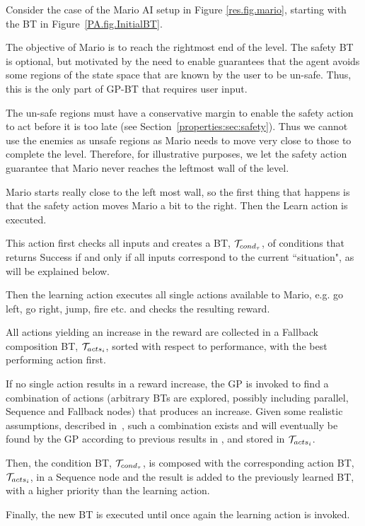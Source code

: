 \begin{example}
Consider the case of the Mario AI setup in Figure \ref{res.fig.mario},  starting with the BT in Figure~\ref{PA.fig.InitialBT}.

The objective of Mario is to reach the rightmost end of the level.
The safety BT is optional, but motivated by the need 
to enable guarantees that the agent avoids some regions of the state space that are known by the user to be un-safe.
Thus, this is the only part of GP-BT that requires user input.

The un-safe regions must have a conservative margin to enable the safety action to act before it is too late (see Section~\ref{properties:sec:safety}).
Thus we cannot use the enemies as unsafe regions as
Mario needs to move very close to those to complete the level.
Therefore, for illustrative purposes, we let the safety action guarantee that Mario never reaches the leftmost wall of the level.

Mario starts really close to the left most wall, so the first thing that happens is that the safety action moves Mario a bit to the right. Then the Learn action is executed.

This action first checks all inputs and creates a BT, $\mathcal{T}_{cond_\tau}$, of conditions that returns Success if and only if all inputs correspond to the current ``situation", as will be explained below.

Then the learning action executes all single actions available to Mario, e.g. go left, go right, jump, fire etc. and checks the resulting  reward.

All actions yielding an increase in the reward are collected in a Fallback composition BT, $\mathcal{T}_{acts_i}$, sorted with respect to performance,  with the best performing action first.

If no single action results in a reward increase, the GP is invoked to find a combination of actions (arbitrary BTs are explored, possibly including parallel, Sequence and Fallback nodes) that produces an increase. Given some realistic assumptions, described in~\cite{colledanchise2015learning}, such a combination exists and will eventually be found by the GP according to previous results in \cite{rudolph1994convergence}, and stored in $\mathcal{T}_{acts_i}$.

%
Then, the condition BT, $\mathcal{T}_{cond_\tau}$, is composed with the corresponding action BT, $\mathcal{T}_{acts_i}$, in a Sequence node and the result is added to the previously learned BT, with a higher priority than the learning action.

Finally, the new BT is executed until once again the learning action is invoked.
\end{example}


